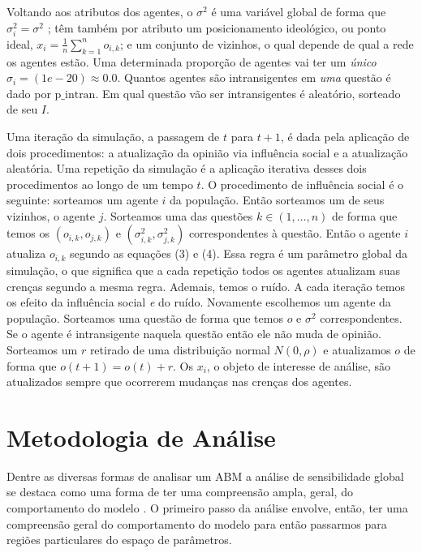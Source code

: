 Voltando aos atributos dos agentes, o \(\sigma^2\) é uma variável global de forma que
\(\sigma_i^2 = \sigma^2\) ; têm também por atributo um posicionamento ideológico, ou ponto
ideal, \(x_i = \frac{1}{n} \sum_{k = 1}^n o_{i,k} \); e um conjunto de vizinhos, o
qual depende de qual a rede os agentes estão. Uma determinada proporção de
agentes vai ter um \textit{único} \(\sigma_i = (1e-20 ) \approx 0.0 \). Quantos agentes são
intransigentes em \textit{uma} questão é dado por \(\text{p\_intran}\). Em qual
questão vão ser intransigentes é aleatório, sorteado de seu \(I\).

Uma iteração da simulação, a passagem de \(t\) para \(t+1\), é dada pela
aplicação de dois procedimentos: a atualização da opinião via influência social
e a atualização aleatória. Uma repetição da simulação é a aplicação iterativa
desses dois procedimentos ao longo de um tempo \(t \). O procedimento de
influência social é o seguinte: sorteamos um agente \(i\) da população. Então
sorteamos um de seus vizinhos, o agente \(j\). Sorteamos uma das questões \(k \in
(1,\ldots,n)\) de forma que temos os \((o_{i,k},o_{j,k})\) e
\((\sigma_{i,k}^2,\sigma_{j,k}^2)\) correspondentes à questão. Então o agente \(i\)
atualiza \(o_{i,k}\) segundo as equações (3) e (4). Essa regra é um parâmetro
global da simulação, o que significa que a cada repetição todos os agentes
atualizam suas crenças segundo a mesma regra. Ademais, temos o ruído. A cada
iteração temos os efeito da influência social \textit{e} do ruído. Novamente
escolhemos um agente da população. Sorteamos uma questão de forma que temos
\(o\) e \(\sigma^2\) correspondentes. Se o agente é intransigente naquela questão
então ele não muda de opinião. Sorteamos um \(r\) retirado de uma distribuição
normal \(N(0,\rho)\) e atualizamos \(o\) de forma que \(o(t+1) = o(t) + r\). Os
\(x_i\), o objeto de interesse de análise, são atualizados sempre que ocorrerem
mudanças nas crenças dos agentes.

\section{Metodologia de Análise}

Dentre as diversas formas de analisar um ABM a análise de sensibilidade global
se destaca como uma forma de ter uma compreensão ampla, geral, do comportamento
do modelo \cite{north2007managing}. O primeiro passo da análise envolve, então,
 ter uma compreensão geral do comportamento do modelo para então passarmos
para regiões particulares do espaço de parâmetros.

